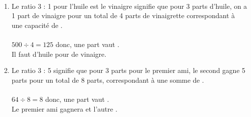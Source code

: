 \ \\ [-5mm]
   \begin{enumerate}
      \item Le ratio 3 : 1 pour l'huile est le vinaigre signifie que pour 3 parts d'huile, on a 1 part de vinaigre pour un total de 4 parts de vinaigrette correspondant à une capacité de . \\ [2mm]
            \qquad {} \\
         $500\div4 =125$ donc, une part vaut . \\
         Il faut {\blue {} d'huile pour  de vinaigre.}
      \item Le ratio 3 : 5 signifie que pour 3 parts pour le premier ami, le second gagne 5 parts pour un total de 8 parts, correspondant à une somme de . \\ [2mm]
            \qquad {} \\
            $64\div8 =8$ donc, une part vaut . \\
            {\blue Le premier ami gagnera  et l'autre .}
   \end{enumerate}
